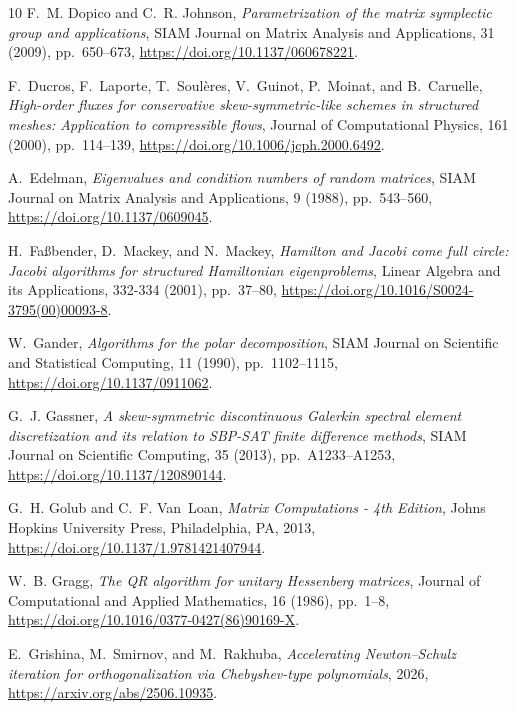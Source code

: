 \documentclass[final,onefignum,onetabnum,dvipsnames]{siamart251216}
\numberwithin{algorithm}{section}
\numberwithin{equation}{section}
\begin{document}
\begin{thebibliography}{10}
{\sc F.~M. Dopico and C.~R. Johnson}, {\em Parametrization of the matrix symplectic group and applications}, SIAM Journal on Matrix Analysis and Applications, 31 (2009), pp.~650--673, \url{https://doi.org/10.1137/060678221}.

{\sc F.~Ducros, F.~Laporte, T.~Soul{\`e}res, V.~Guinot, P.~Moinat, and B.~Caruelle}, {\em High-order fluxes for conservative skew-symmetric-like schemes in structured meshes: Application to compressible flows}, Journal of Computational Physics, 161 (2000), pp.~114--139, \url{https://doi.org/10.1006/jcph.2000.6492}.

{\sc A.~Edelman}, {\em Eigenvalues and condition numbers of random matrices}, SIAM Journal on Matrix Analysis and Applications, 9 (1988), pp.~543--560, \url{https://doi.org/10.1137/0609045}.

{\sc H.~Faßbender, D.~Mackey, and N.~Mackey}, {\em {H}amilton and {J}acobi come full circle: {J}acobi algorithms for structured {H}amiltonian eigenproblems}, Linear Algebra and its Applications, 332-334 (2001), pp.~37--80, \url{https://doi.org/10.1016/S0024-3795(00)00093-8}.

{\sc W.~Gander}, {\em Algorithms for the polar decomposition}, SIAM Journal on Scientific and Statistical Computing, 11 (1990), pp.~1102--1115, \url{https://doi.org/10.1137/0911062}.

{\sc G.~J. Gassner}, {\em A skew-symmetric discontinuous {G}alerkin spectral element discretization and its relation to {SBP}-{SAT} finite difference methods}, SIAM Journal on Scientific Computing, 35 (2013), pp.~A1233--A1253, \url{https://doi.org/10.1137/120890144}.

{\sc G.~H. Golub and C.~F. Van~Loan}, {\em Matrix Computations - 4th Edition}, Johns Hopkins University Press, Philadelphia, PA, 2013, \url{https://doi.org/10.1137/1.9781421407944}.

{\sc W.~B. Gragg}, {\em The {QR} algorithm for unitary {H}essenberg matrices}, Journal of Computational and Applied Mathematics, 16 (1986), pp.~1--8, \url{https://doi.org/10.1016/0377-0427(86)90169-X}.

{\sc E.~Grishina, M.~Smirnov, and M.~Rakhuba}, {\em Accelerating {N}ewton--{S}chulz iteration for orthogonalization via {C}hebyshev-type polynomials}, 2026, \url{https://arxiv.org/abs/2506.10935}.


\end{thebibliography}
\end{document}
